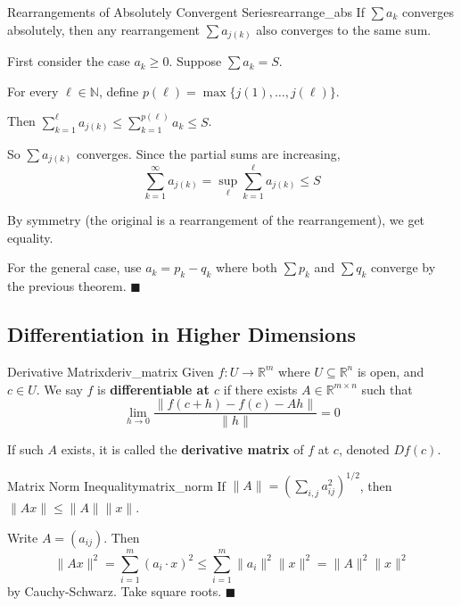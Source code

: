 \documentclass[11pt, letterpaper, openany]{book}
\renewenvironment{proof}[1][\proofname]{%
  \tcolorbox[blanker, breakable, left=1em,
    before skip=1em, after skip=1em,
    borderline west={2pt}{0pt}{MagicTeal!50},
    colback=MagicCream,
    before upper={\textcolor{MagicTeal}{\sffamily\bfseries #1.}\space}
  ]%
}{%
  \hfill\textcolor{MagicTeal}{\ensuremath{\blacksquare}}\endtcolorbox%
}
\begin{document}
\begin{thm}{Rearrangements of Absolutely Convergent Series}{rearrange_abs}
If $\sum a_k$ converges absolutely, then any rearrangement $\sum a_{j(k)}$ also converges to the same sum.
\end{thm}

\begin{proof}
First consider the case $a_k \geq 0$. Suppose $\sum a_k = S$.

For every $\ell \in \mathbb{N}$, define $p(\ell) = \max\{j(1), \ldots, j(\ell)\}$.

Then $\sum_{k=1}^\ell a_{j(k)} \leq \sum_{k=1}^{p(\ell)} a_k \leq S$.

So $\sum a_{j(k)}$ converges. Since the partial sums are increasing,
\[\sum_{k=1}^\infty a_{j(k)} = \sup_\ell \sum_{k=1}^\ell a_{j(k)} \leq S\]

By symmetry (the original is a rearrangement of the rearrangement), we get equality.

For the general case, use $a_k = p_k - q_k$ where both $\sum p_k$ and $\sum q_k$ converge by the previous theorem.
\end{proof}

\subsection{Differentiation in Higher Dimensions}

\begin{defn}{Derivative Matrix}{deriv_matrix}
Given $f: U \to \mathbb{R}^m$ where $U \subseteq \mathbb{R}^n$ is open, and $c \in U$. We say $f$ is \textbf{differentiable at $c$} if there exists $A \in \mathbb{R}^{m \times n}$ such that
\[\lim_{h \to 0} \frac{\|f(c+h) - f(c) - Ah\|}{\|h\|} = 0\]

If such $A$ exists, it is called the \textbf{derivative matrix} of $f$ at $c$, denoted $Df(c)$.
\end{defn}

\begin{lem}{Matrix Norm Inequality}{matrix_norm}
If $\|A\| = \left(\sum_{i,j} a_{ij}^2\right)^{1/2}$, then $\|Ax\| \leq \|A\| \|x\|$.
\end{lem}

\begin{proof}
Write $A = (a_{ij})$. Then
\[\|Ax\|^2 = \sum_{i=1}^m (a_i \cdot x)^2 \leq \sum_{i=1}^m \|a_i\|^2 \|x\|^2 = \|A\|^2 \|x\|^2\]
by Cauchy-Schwarz. Take square roots.
\end{proof}
\end{document}
